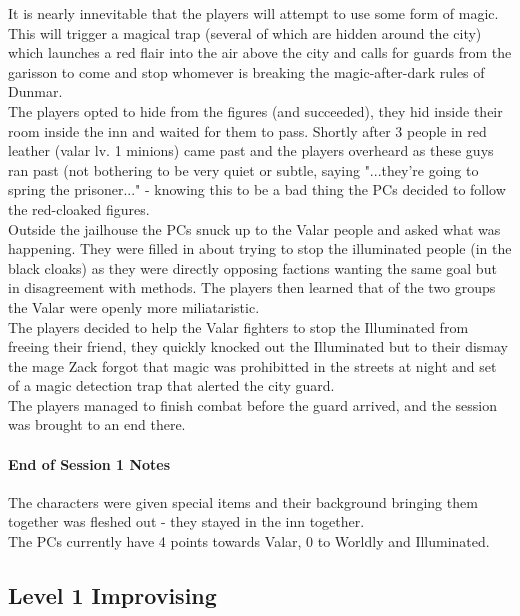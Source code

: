 \documentclass[10pt,twoside,twocolumn]{article}
\begin{document}
It is nearly innevitable that the players will attempt to use some form of magic. This will trigger a magical trap (several of which are hidden around the city) which launches a red flair into the air above the city and calls for guards from the garisson to come and stop whomever is breaking the magic-after-dark rules of Dunmar. \\

The players opted to hide from the figures (and succeeded), they hid inside their room inside the inn and waited for them to pass. Shortly after 3 people in red leather (valar lv. 1 minions) came past and the players overheard as these guys ran past (not bothering to be very quiet or subtle, saying "...they're going to spring the prisoner..." - knowing this to be a bad thing the PCs decided to follow the red-cloaked figures. \\

Outside the jailhouse the PCs snuck up to the Valar people and asked what was happening. They were filled in about trying to stop the illuminated people (in the black cloaks) as they were directly opposing factions wanting the same goal but in disagreement with methods. The players then learned that of the two groups the Valar were openly more miliataristic. \\

The players decided to help the Valar fighters to stop the Illuminated from freeing their friend, they quickly knocked out the Illuminated but to their dismay the mage Zack forgot that magic was prohibitted in the streets at night and set of a magic detection trap that alerted the city guard. \\

The players managed to finish combat before the guard arrived, and the session was brought to an end there.

\paragraph{End of Session 1 Notes}
The characters were given special items and their background bringing them together was fleshed out - they stayed in the inn together. \\

The PCs currently have 4 points towards Valar, 0 to Worldly and Illuminated.

\subsection{Level 1 Improvising}
\end{document}
